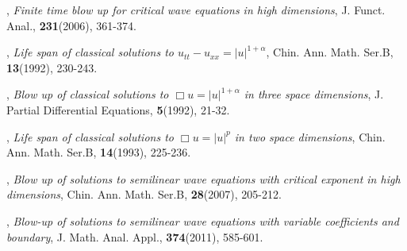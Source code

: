 \documentclass[a4paper,12pt]{article}
\numberwithin{equation}{section}
\begin{document}
\begin{thebibliography}{20}
,
{\it Finite time blow up for critical wave equations in high dimensions},
J. Funct. Anal., {\bf 231}(2006), 361-374.

,
{\it Life span of classical solutions to $u_{tt}-u_{xx}=|u|^{1+\alpha}$},
Chin. Ann. Math. Ser.B, {\bf 13}(1992), 230-243.

,
{\it Blow up of classical solutions to $\Box u=|u|^{1+\alpha}$ in three space dimensions},
J. Partial Differential Equations, {\bf 5}(1992), 21-32.

,
{\it Life span of classical solutions to $\Box u=|u|^{p}$ in two space dimensions},
Chin. Ann. Math. Ser.B, {\bf 14}(1993), 225-236.

,
{\it Blow up of solutions to semilinear wave equations
with critical exponent in high dimensions},
Chin. Ann. Math. Ser.B, {\bf 28}(2007), 205-212.

,
{\it Blow-up of solutions to semilinear wave equations
with variable coefficients and boundary},
J. Math. Anal. Appl., {\bf 374}(2011), 585-601.

\end{thebibliography}
\end{document}
